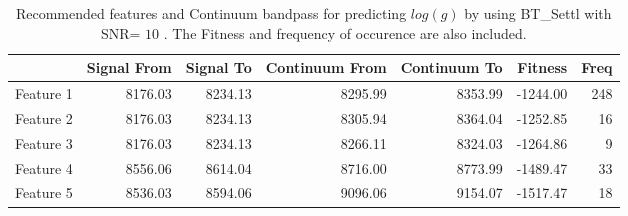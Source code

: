 {{{{\begin{table}
\begin{center}
\begin{tabular}{rrrrrrr}
  \hline
 & Signal From & Signal To & Continuum From & Continuum To & Fitness & Freq \\ 
  \hline
Feature 1 & 8176.03 & 8234.13 & 8295.99 & 8353.99 & -1244.00 & 248 \\ 
  Feature 2 & 8176.03 & 8234.13 & 8305.94 & 8364.04 & -1252.85 &  16 \\ 
  Feature 3 & 8176.03 & 8234.13 & 8266.11 & 8324.03 & -1264.86 &   9 \\ 
  Feature 4 & 8556.06 & 8614.04 & 8716.00 & 8773.99 & -1489.47 &  33 \\ 
  Feature 5 & 8536.03 & 8594.06 & 9096.06 & 9154.07 & -1517.47 &  18 \\ 
   \hline
\end{tabular}
\caption {Recommended features and Continuum bandpass for predicting $log(g)$ 
      by using BT\_Settl with SNR= $ 10 $ . 
      The Fitness and frequency of occurence are also included.} \label{tab:tab_SNR10_G} 
\end{center}
\end{table}

}}}}
